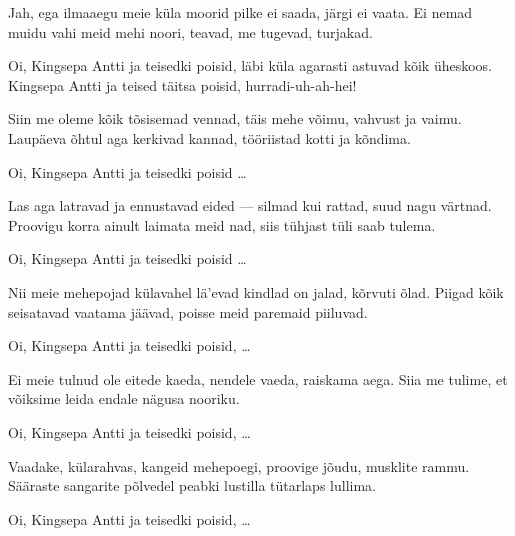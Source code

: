 Jah, ega ilmaaegu meie k\"ula moorid
pilke ei saada, j\"argi ei vaata.
Ei nemad muidu vahi meid mehi noori,
teavad, me tugevad, turjakad.

Oi, Kingsepa Antti ja teisedki poisid,
l\"abi k\"ula agarasti astuvad k\~oik \"uheskoos.
Kingsepa Antti ja teised t\"aitsa poisid,
hurradi-uh-ah-hei!

Siin me oleme k\~oik t\~osisemad vennad,
t\"ais mehe v\~oimu, vahvust ja vaimu.
Laup\"aeva \~ohtul aga kerkivad kannad,
t\"o\"oriistad kotti ja k\~ondima.

Oi, Kingsepa Antti ja teisedki poisid \ldots

Las aga latravad ja ennustavad eided ---
silmad kui rattad, suud nagu v\"artnad.
Proovigu korra ainult laimata meid nad,
siis t\"uhjast t\"uli saab tulema.

Oi, Kingsepa Antti ja teisedki poisid \ldots

Nii meie mehepojad k\"ulavahel l\"a'evad
kindlad on jalad, k\~orvuti \~olad.
Piigad k\~oik seisatavad vaatama j\"a\"avad,
poisse meid paremaid piiluvad.

Oi, Kingsepa Antti ja teisedki poisid, \ldots

Ei meie tulnud ole eitede kaeda,
nendele vaeda, raiskama aega.
Siia me tulime, et v\~oiksime leida
endale n\"agusa nooriku.

Oi, Kingsepa Antti ja teisedki poisid, \ldots

Vaadake, k\"ularahvas, kangeid mehepoegi,
proovige j\~oudu, musklite rammu.
S\"a\"araste sangarite p\~olvedel peabki
lustilla t\"utarlaps lullima.

Oi, Kingsepa Antti ja teisedki poisid, \ldots
